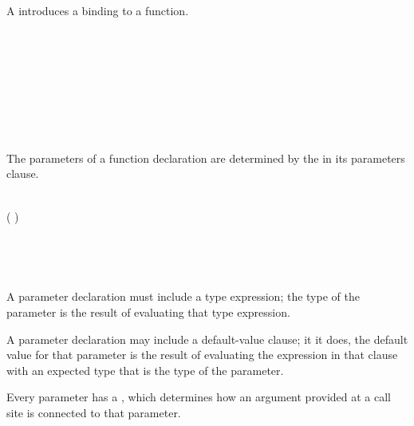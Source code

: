 
A  introduces a binding to a function.

\begin{Syntax}
     \\
          \\
            \SynOpt \\
             \\
            \SynOpt \\
            \SynOpt \\
             \\
\end{Syntax}


The parameters of a function declaration are determined by the  in its parameters clause.

\begin{Syntax}
     \\
        \code{(} ( \code{,}) \SynStar \code{)}

     \\
         \code{:} \SynOpt {} \SynOpt

     \\
        \code{=} 
\end{Syntax}

A parameter declaration must include a type expression; the type of the parameter is the result of evaluating that type expression.

A parameter declaration may include a default-value clause; it it does, the default value for that parameter is the result of evaluating the expression in that clause with an expected type that is the type of the parameter.


Every parameter has a , which determines how an argument provided at a call site is connected to that parameter.

\begin{Syntax}
     \\
         \\
        \SynOr {} \\
        \SynOr {} \\
        \SynOr {} \\
        \SynOr {} \SynOr {}
        \SynOr {} \\
\end{Syntax}

